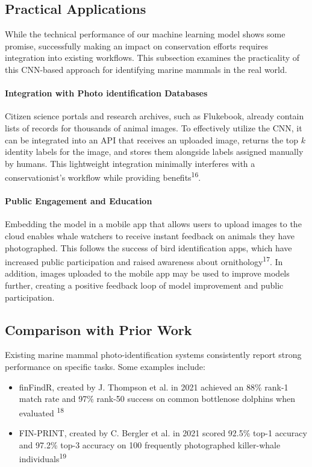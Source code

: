 \documentclass[twocolumn]{article}
\begin{document}
\subsection{Practical Applications}

While the technical performance of our machine learning model shows some promise, successfully making an impact on conservation efforts requires integration into existing workflows. This subsection examines the practicality of this CNN-based approach for identifying marine mammals in the real world.

\paragraph{Integration with Photo identification Databases}

Citizen science portals and research archives, such as Flukebook, already contain lists of records for thousands of animal images. To effectively utilize the CNN, it can be integrated into an API that receives an uploaded image, returns the top $k$ identity labels for the image, and stores them alongside labels assigned manually by humans. This lightweight integration minimally interferes with a conservationist's workflow while providing benefits\textsuperscript{16}.

\paragraph{Public Engagement and Education}

Embedding the model in a mobile app that allows users to upload images to the cloud enables whale watchers to receive instant feedback on animals they have photographed. This follows the success of bird identification apps, which have increased public participation and raised awareness about ornithology\textsuperscript{17}.  In addition, images uploaded to the mobile app may be used to improve models further, creating a positive feedback loop of model improvement and public participation.

\subsection{Comparison with Prior Work}

Existing marine mammal photo-identification systems consistently report strong performance on specific tasks. Some examples include: 
\begin{itemize}
    \item finFindR, created by J. Thompson et al. in 2021 achieved an 88\% rank-1 match rate and 97\% rank-50 success on common bottlenose dolphins when evaluated \textsuperscript{18}
    \item FIN-PRINT, created by C. Bergler et al. in 2021 scored 92.5\% top-1 accuracy and 97.2\% top-3 accuracy on 100 frequently photographed killer-whale individuals\textsuperscript{19}
\end{itemize}
\end{document}
